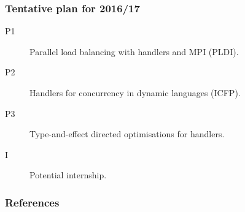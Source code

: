 \documentclass[10pt,compress]{beamer}
\begin{document}
\begin{frame}
  \frametitle{Tentative plan for 2016/17}
\begin{figure}
\centering
{}
\begin{gantt}{6}{12}
 \begin{ganttitle}
    \end{ganttitle}
    \begin{ganttitle}
    \end{ganttitle}
  \end{gantt}
\end{figure}
\begin{description}
  \item[P1] Parallel load balancing with handlers and MPI (PLDI).
  \item[P2] Handlers for concurrency in dynamic languages (ICFP).
  \item[P3] Type-and-effect directed optimisations for handlers.
  \item[I] Potential internship.
\end{description}
\end{frame}

%


\begin{frame}[allowframebreaks]
  \frametitle{References}
  
\end{frame}
\end{document}
